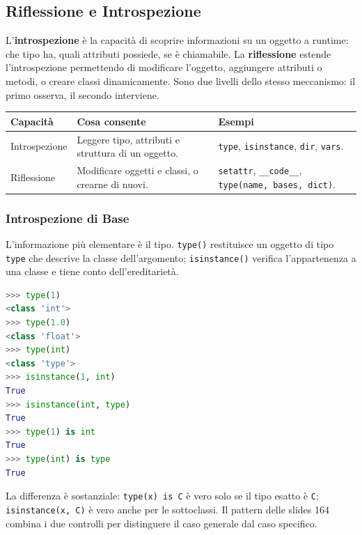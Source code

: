 \documentclass[12pt]{extarticle}
\begin{document}
\subsection{Riflessione e Introspezione}

\noindent L'\textbf{introspezione} è la capacità di scoprire informazioni su un oggetto a runtime: che tipo ha, quali attributi possiede, se è chiamabile. La \textbf{riflessione} estende l'introspezione permettendo di modificare l'oggetto, aggiungere attributi o metodi, o creare classi dinamicamente. Sono due livelli dello stesso meccanismo: il primo osserva, il secondo interviene.

\begin{center}
\small
\begin{tabular}{p{4.0cm}p{5.0cm}p{5.0cm}}
    \toprule
    \textbf{Capacità} & \textbf{Cosa consente} & \textbf{Esempi} \\
    \midrule
    Introspezione & Leggere tipo, attributi e struttura di un oggetto. & \texttt{type}, \texttt{isinstance}, \texttt{dir}, \texttt{vars}. \\
    \addlinespace
    Riflessione & Modificare oggetti e classi, o crearne di nuovi. & \texttt{setattr}, \texttt{\_\_code\_\_}, \texttt{type(name, bases, dict)}. \\
    \bottomrule
\end{tabular}
\end{center}

\subsubsection{Introspezione di Base}

\noindent L'informazione più elementare è il tipo. \texttt{type()} restituisce un oggetto di tipo \texttt{type} che descrive la classe dell'argomento; \texttt{isinstance()} verifica l'appartenenza a una classe e tiene conto dell'ereditarietà.

\begin{lstlisting}[language=Python]
>>> type(1)
<class 'int'>
>>> type(1.0)
<class 'float'>
>>> type(int)
<class 'type'>
>>> isinstance(1, int)
True
>>> isinstance(int, type)
True
>>> type(1) is int
True
>>> type(int) is type
True
\end{lstlisting}

\noindent La differenza è sostanziale: \texttt{type(x) is C} è vero solo se il tipo esatto è \texttt{C}; \texttt{isinstance(x, C)} è vero anche per le sottoclassi. Il pattern delle slides 164 combina i due controlli per distinguere il caso generale dal caso specifico.
\end{document}
